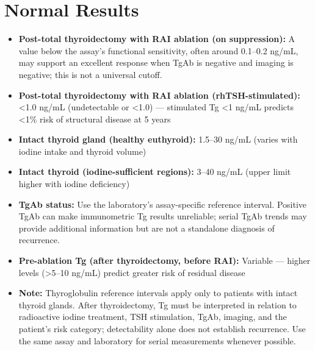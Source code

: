 \section*{Normal Results}
\begin{itemize}
  \item \textbf{Post-total thyroidectomy with RAI ablation (on suppression):} A value below the assay's functional sensitivity, often around 0.1--0.2 ng/mL, may support an excellent response when TgAb is negative and imaging is negative; this is not a universal cutoff.
  \item \textbf{Post-total thyroidectomy with RAI ablation (rhTSH-stimulated):} <1.0 ng/mL (undetectable or <1.0) --- stimulated Tg <1 ng/mL predicts <1\% risk of structural disease at 5 years
  \item \textbf{Intact thyroid gland (healthy euthyroid):} 1.5--30 ng/mL (varies with iodine intake and thyroid volume)
  \item \textbf{Intact thyroid (iodine-sufficient regions):} 3--40 ng/mL (upper limit higher with iodine deficiency)
  \item \textbf{TgAb status:} Use the laboratory's assay-specific reference interval. Positive TgAb can make immunometric Tg results unreliable; serial TgAb trends may provide additional information but are not a standalone diagnosis of recurrence.
  \item \textbf{Pre-ablation Tg (after thyroidectomy, before RAI):} Variable --- higher levels (>5--10 ng/mL) predict greater risk of residual disease
  \item \textbf{Note:} Thyroglobulin reference intervals apply only to patients with intact thyroid glands. After thyroidectomy, Tg must be interpreted in relation to radioactive iodine treatment, TSH stimulation, TgAb, imaging, and the patient's risk category; detectability alone does not establish recurrence. Use the same assay and laboratory for serial measurements whenever possible.
\end{itemize}

